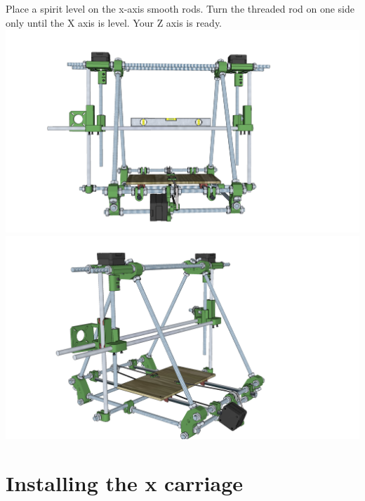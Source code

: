\documentclass[twoside,a4paper,titlepage]{memoir}
\begin{document}
	\section{}
	Place a spirit level on the x-axis smooth rods. Turn the threaded rod on one side only until the X axis is
	level. Your Z axis is ready.\\
	\includegraphics[width=1\linewidth]{graphics/ch8_24_1.png}
	\includegraphics[width=1\linewidth]{graphics/ch8_24_2.png}
	
	\chapter{Installing the x carriage}
\end{document}
